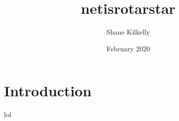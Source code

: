 \documentclass{article}
\title{netisrotarstar}
\author{Shane Kilkelly}
\date{February 2020}
\begin{document}
\maketitle

\section{Introduction}
lol
\end{document}
